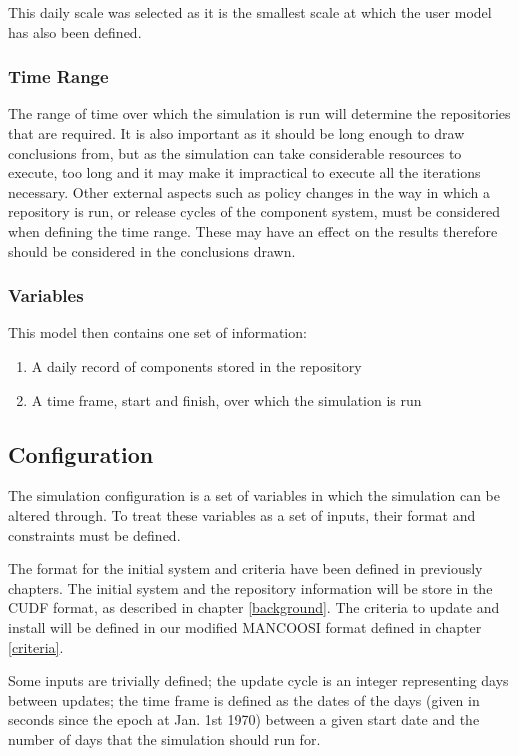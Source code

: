 This daily scale was selected as it is the smallest scale at which the user model has also been defined.

\subsubsection{Time Range}
The range of time over which the simulation is run will determine the repositories that are required.
It is also important as it should be long enough to draw conclusions from,
but as the simulation can take considerable resources to execute, too long and it may make it impractical to execute all the iterations necessary.
Other external aspects such as policy changes in the way in which a repository is run, or release cycles of the component system, 
must be considered when defining the time range.
These may have an effect on the results therefore should be considered in the conclusions drawn.

\subsubsection{Variables}

This model then contains one set of information:
\begin{enumerate}
  \item A daily record of components stored in the repository
  \item A time frame, start and finish, over which the simulation is run
\end{enumerate}

\subsection{Configuration}
The simulation configuration is a set of variables in which the simulation can be altered through.
To treat these variables as a set of inputs, their format and constraints must be defined.

The format for the initial system and criteria have been defined in previously chapters.
The initial system and the repository information will be store in the CUDF format, as described in chapter \ref{background}. 
The criteria to update and install will be defined in our modified MANCOOSI format defined in chapter \ref{criteria}.

Some inputs are trivially defined;
the update cycle is an integer representing days between updates;
the time frame is defined as the dates of the days (given in seconds since the epoch at Jan. 1st 1970) between a given start date and the number of days that the simulation should run for.

